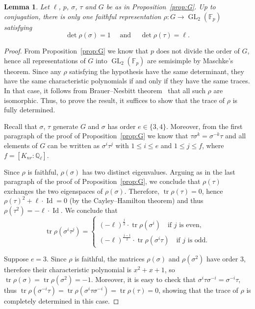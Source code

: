 \documentclass[12pt]{amsart}
\numberwithin{equation}{section}
\newtheorem{lemma}[equation]{Lemma}
\theoremstyle{definition}
\newcommand{\F}{\mathbb{F}}
\newcommand{\Q}{\mathbb{Q}}
\DeclareMathOperator{\GL}{GL}
\DeclareMathOperator{\Id}{Id}
\DeclareMathOperator{\tr}{tr}
\begin{document}
\begin{lemma}
    \label{lem:faithful} 
    Let $\ell$, $p$, $\sigma$, $\tau$ and $G$ be as in Proposition~\ref{prop:G}. Up to conjugation, there is only one faithful representation $\rho : G \to \GL_2(\F_p)$ satisfying
    \[
    \det \rho(\sigma) = 1 \quad \text{ and } \quad \det \rho(\tau) = \ell.
    \]
\end{lemma}
\begin{proof}
    From Proposition~\ref{prop:G} we know that $p$ does not divide the order of $G$, hence all representations of $G$ into $\GL_2(\F_p)$ are semisimple by Maschke’s theorem. 
Since any $\rho$ satisfying the hypothesis have the same determinant, they have the same
characteristic polynomials if and only if they have the same traces. In that case, it follows from Brauer--Nesbitt theorem~\cite[Theorem~30.16]{CurtisReiner} that all such $\rho$ are isomorphic.
Thus, to prove the result, it suffices to show that the trace of $\rho$ is fully determined.  

    Recall that $\sigma$, $\tau$ generate $G$ and $\sigma$ has order $e \in \{3,4\}$. Moreover, from the first paragraph of the proof of Proposition~\ref{prop:G}
    we know that $\tau\sigma^k = \sigma^{-k}\tau$ and all elements of $G$ can be written as 
    $\sigma^i \tau^j$ with $1 \leq i \leq e$ and $1 \leq j \leq f$, where $f=[K_{nr} : \Q_\ell]$.  
    
    Since \(\rho\) is faithful, \(\rho(\sigma)\) has two distinct
eigenvalues.     Arguing as in the last paragraph of the proof of Proposition~\ref{prop:G}, we conclude that $\rho(\tau)$ exchanges the two eigenspaces of $\rho(\sigma)$. Therefore,  $\tr \rho(\tau) = 0$, hence $\rho(\tau)^2 + \ell \cdot\Id = 0$ (by the Cayley--Hamilton theorem) and thus $\rho(\tau^2) = -\ell \cdot \Id$. We conclude that 
$$\tr \rho(\sigma^i \tau^j) =      
\begin{cases}
 (-\ell)^\frac{j}{2} \cdot \tr \rho(\sigma^i) \quad \text{if }j\text{ is even,} \\
(-\ell)^\frac{j-1}{2} \cdot \tr \rho(\sigma^i \tau) \quad \text{if } j\text{ is odd.}
\end{cases} $$

Suppose $e=3$. Since $\rho$ is faithful, the matrices 
$\rho(\sigma)$ and $\rho(\sigma^2)$ have order $3$, therefore their characteristic polynomial is $x^2 + x + 1$, so $\tr \rho(\sigma) = \tr \rho(\sigma^2) = -1$. Moreover, it is easy to check that $\sigma^i \tau \sigma^{-i} = \sigma^{-i} \tau$, thus $\tr \rho(\sigma^{-i} \tau) = \tr \rho(\sigma^i \tau \sigma^{-i}) = \tr \rho(\tau) = 0$, showing that the trace of $\rho$ is completely determined in this case.


\end{proof}
\end{document}
